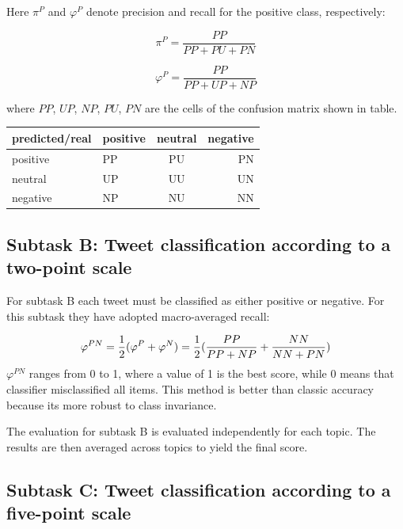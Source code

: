 \documentclass[runningheads,a4paper]{llncs}
\begin{document}
Here $\pi^P$ and $\varphi^P$ denote precision and recall for the positive class, respectively: 

\begin{equation}
\pi^P = \frac{PP}{PP + PU + PN}
\end{equation}

\begin{equation}
\varphi^P = \frac{PP}{PP + UP + NP}
\end{equation}

where $PP$, $UP$, $NP$, $PU$, $PN$ are the cells of the confusion matrix shown in table. 

\begin{center}
  \begin{tabular}{ | l | l | c | r |}
    \hline
  predicted/real   & positive & neutral & negative \\ \hline
   positive  & PP & PU & PN \\ \hline
   neutral  & UP & UU & UN \\ \hline
   negative  & NP & NU & NN \\
    \hline
  \end{tabular}
\end{center}

\subsection{Subtask B: Tweet classification according to a two-point scale}
For subtask B each tweet must be classified as either positive or negative. For this subtask they have adopted macro-averaged recall: 

\begin{equation}
\varphi^{PN} = \frac{1}{2}(\varphi^P + \varphi^N) \\
= \frac{1}{2}(\frac{PP}{PP + NP} + \frac{NN}{NN + PN})
\end{equation}
$\varphi^{PN}$ ranges from 0 to 1, where a value of 1 is the best score, while 0 means that classifier misclassified all items. This method is better than classic accuracy because its more robust to class invariance. 

The evaluation for subtask B is evaluated independently for each topic. The results are then averaged across topics to yield the final score.


\subsection{Subtask C: Tweet classification according to a five-point scale}
\end{document}
